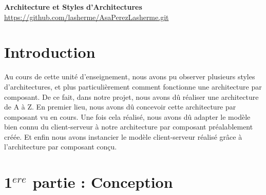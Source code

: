 \documentclass[11pt, a4paper, notitlepage]{article}
\newcommand\tab{\hspace*{10mm}}
\begin{document}
\begin{center}
   \huge\textbf{Architecture et Styles d'Architectures}\\
   \vspace*{3mm}
   \large{\url{https://github.com/lasherme/AsaPerezLasherme.git} }
\end{center}
\vspace{2mm}

\section*{Introduction}
\tab Au cours de cette unité d'enseignement, nous avons pu observer plusieurs styles d'architectures, et plus particulièrement comment fonctionne une architecture par composant. De ce fait, dans notre projet, nous avons dû réaliser une architecture de A à Z. En premier lieu, nous avons dû concevoir cette architecture par composant vu en cours. Une fois cela réalisé, nous avons dû adapter le modèle bien connu du client-serveur à notre architecture par composant préalablement créée. Et enfin nous avons instancier le modèle client-serveur réalisé grâce à l'architecture par composant conçu.

\section*{1$^{ere}$ partie : Conception}
\end{document}
